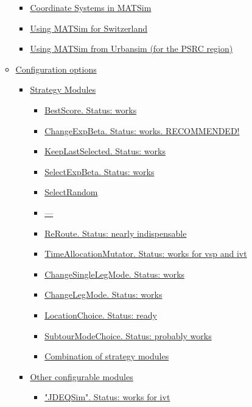 \documentclass[a4paper,11pt]{report}
\begin{document}
\begin{itemize}
\begin{itemize}
\begin{itemize}
	\item \href{http://www.matsim.org/node/405}{Coordinate Systems in MATSim}
	\item \href{http://www.matsim.org/node/580}{Using MATSim for Switzerland}
	\item \href{http://www.matsim.org/matsim4urbansim}{Using MATSim from Urbansim (for the PSRC region)}
\end{itemize}
	\item \href{http://www.matsim.org/node/740}{Configuration options}
\begin{itemize}
	\item \href{http://www.matsim.org/node/478}{Strategy Modules}
\begin{itemize}
	\item \href{http://www.matsim.org/node/698}{BestScore.  Status: works}
	\item \href{http://www.matsim.org/node/700}{ChangeExpBeta. Status: works. RECOMMENDED!}
	\item \href{http://www.matsim.org/node/702}{KeepLastSelected. Status: works}
	\item \href{http://www.matsim.org/node/699}{SelectExpBeta. Status: works}
	\item \href{http://www.matsim.org/node/701}{SelectRandom}
	\item \href{http://www.matsim.org/node/697}{---}
	\item \href{http://www.matsim.org/node/573}{ReRoute.  Status: nearly indispensable}
	\item \href{http://www.matsim.org/node/388}{TimeAllocationMutator.  Status: works for vsp and ivt}
	\item \href{http://www.matsim.org/node/736}{ ChangeSingleLegMode. Status: works}
	\item \href{http://www.matsim.org/node/387}{ChangeLegMode. Status: works}
	\item \href{http://www.matsim.org/node/218}{LocationChoice. Status: ready}
	\item \href{http://www.matsim.org/node/477}{SubtourModeChoice. Status: probably works}
	\item \href{http://www.matsim.org/node/690}{Combination of strategy modules}
\end{itemize}
	\item \href{http://www.matsim.org/node/377}{Other configurable modules}
\begin{itemize}
	\item \href{http://www.matsim.org/docs/jdeqsim}{"JDEQSim".  Status: works for ivt}

\end{itemize}
\end{itemize}
\end{itemize}
\end{itemize}
\end{document}
